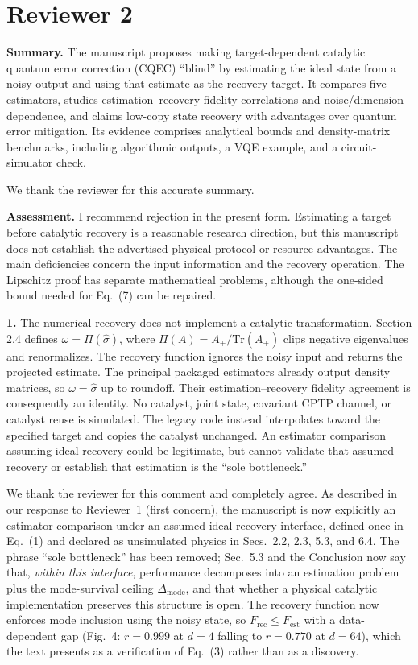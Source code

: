 \documentclass[11pt,a4paper]{article}
\newcommand{\rev}[1]{{\color{black}#1}}
\newcommand{\resp}[1]{{\color{red}#1}}
\newcommand{\Frec}{F_\mathrm{rec}}
\newcommand{\Fest}{F_\mathrm{est}}
\begin{document}
\section*{Reviewer 2}

\rev{\textbf{Summary.} The manuscript proposes making target-dependent catalytic quantum error correction (CQEC) ``blind'' by estimating the ideal state from a noisy output and using that estimate as the recovery target. It compares five estimators, studies estimation--recovery fidelity correlations and noise/dimension dependence, and claims low-copy state recovery with advantages over quantum error mitigation. Its evidence comprises analytical bounds and density-matrix benchmarks, including algorithmic outputs, a VQE example, and a circuit-simulator check.}

\resp{We thank the reviewer for this accurate summary.}

\rev{\textbf{Assessment.} I recommend rejection in the present form. Estimating a target before catalytic recovery is a reasonable research direction, but this manuscript does not establish the advertised physical protocol or resource advantages. The main deficiencies concern the input information and the recovery operation. The Lipschitz proof has separate mathematical problems, although the one-sided bound needed for Eq.~(7) can be repaired.}

\rev{\textbf{1.} The numerical recovery does not implement a catalytic transformation. Section 2.4 defines $\omega = \Pi(\hat\sigma)$, where $\Pi(A) = A_+/\mathrm{Tr}(A_+)$ clips negative eigenvalues and renormalizes. The recovery function ignores the noisy input and returns the projected estimate. The principal packaged estimators already output density matrices, so $\omega = \hat\sigma$ up to roundoff. Their estimation--recovery fidelity agreement is consequently an identity. No catalyst, joint state, covariant CPTP channel, or catalyst reuse is simulated. The legacy code instead interpolates toward the specified target and copies the catalyst unchanged. An estimator comparison assuming ideal recovery could be legitimate, but cannot validate that assumed recovery or establish that estimation is the ``sole bottleneck.''}

\resp{We thank the reviewer for this comment and completely agree. As described in our response to Reviewer~1 (first concern), the manuscript is now explicitly an estimator comparison under an assumed ideal recovery interface, defined once in Eq.~(1) and declared as unsimulated physics in Secs.~2.2, 2.3, 5.3, and 6.4. The phrase ``sole bottleneck'' has been removed; Sec.~5.3 and the Conclusion now say that, \emph{within this interface}, performance decomposes into an estimation problem plus the mode-survival ceiling $\Delta_\mathrm{mode}$, and that whether a physical catalytic implementation preserves this structure is open. The recovery function now enforces mode inclusion using the noisy state, so $\Frec \leq \Fest$ with a data-dependent gap (Fig.~4: $r = 0.999$ at $d = 4$ falling to $r = 0.770$ at $d = 64$), which the text presents as a verification of Eq.~(3) rather than as a discovery.}
\end{document}
